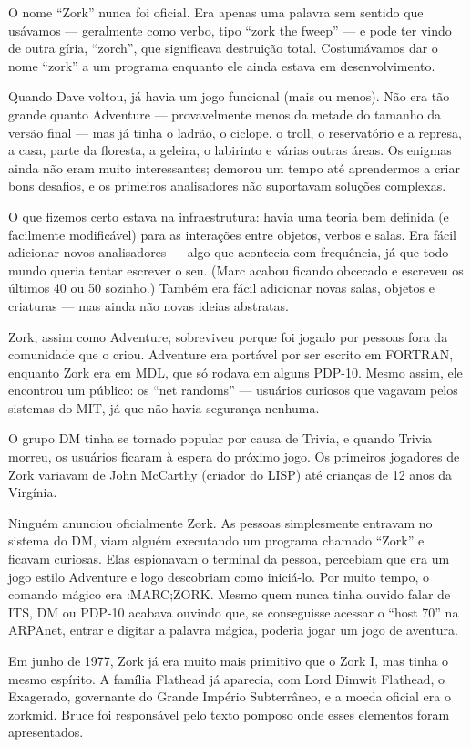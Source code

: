 \documentclass[12pt,a4paper]{article}
\begin{document}
O nome “Zork” nunca foi oficial. Era apenas uma palavra sem sentido que usávamos — geralmente como verbo, tipo “zork the fweep” — e pode ter vindo de outra gíria, “zorch”, que significava destruição total. Costumávamos dar o nome “zork” a um programa enquanto ele ainda estava em desenvolvimento.

Quando Dave voltou, já havia um jogo funcional (mais ou menos). Não era tão grande quanto Adventure — provavelmente menos da metade do tamanho da versão final — mas já tinha o ladrão, o ciclope, o troll, o reservatório e a represa, a casa, parte da floresta, a geleira, o labirinto e várias outras áreas. Os enigmas ainda não eram muito interessantes; demorou um tempo até aprendermos a criar bons desafios, e os primeiros analisadores não suportavam soluções complexas.

O que fizemos certo estava na infraestrutura: havia uma teoria bem definida (e facilmente modificável) para as interações entre objetos, verbos e salas. Era fácil adicionar novos analisadores — algo que acontecia com frequência, já que todo mundo queria tentar escrever o seu. (Marc acabou ficando obcecado e escreveu os últimos 40 ou 50 sozinho.) Também era fácil adicionar novas salas, objetos e criaturas — mas ainda não novas ideias abstratas.

Zork, assim como Adventure, sobreviveu porque foi jogado por pessoas fora da comunidade que o criou. Adventure era portável por ser escrito em FORTRAN, enquanto Zork era em MDL, que só rodava em alguns PDP-10. Mesmo assim, ele encontrou um público: os “net randoms” — usuários curiosos que vagavam pelos sistemas do MIT, já que não havia segurança nenhuma.

O grupo DM tinha se tornado popular por causa de Trivia, e quando Trivia morreu, os usuários ficaram à espera do próximo jogo. Os primeiros jogadores de Zork variavam de John McCarthy (criador do LISP) até crianças de 12 anos da Virgínia.

Ninguém anunciou oficialmente Zork. As pessoas simplesmente entravam no sistema do DM, viam alguém executando um programa chamado “Zork” e ficavam curiosas. Elas espionavam o terminal da pessoa, percebiam que era um jogo estilo Adventure e logo descobriam como iniciá-lo. Por muito tempo, o comando mágico era :MARC;ZORK. Mesmo quem nunca tinha ouvido falar de ITS, DM ou PDP-10 acabava ouvindo que, se conseguisse acessar o “host 70” na ARPAnet, entrar e digitar a palavra mágica, poderia jogar um jogo de aventura.

Em junho de 1977, Zork já era muito mais primitivo que o Zork I, mas tinha o mesmo espírito. A família Flathead já aparecia, com Lord Dimwit Flathead, o Exagerado, governante do Grande Império Subterrâneo, e a moeda oficial era o zorkmid. Bruce foi responsável pelo texto pomposo onde esses elementos foram apresentados.
\end{document}

